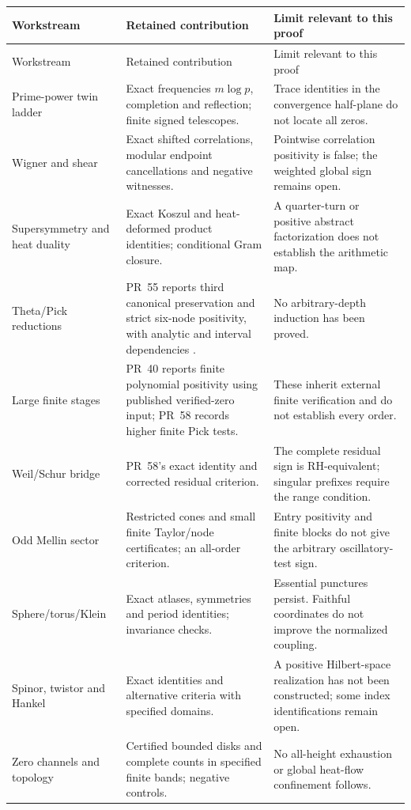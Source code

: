 \documentclass[11pt,letterpaper]{article}
\theoremstyle{definition}
\theoremstyle{remark}
\numberwithin{equation}{section}
\begin{document}
\begin{longtable}{>{\raggedright\arraybackslash}p{}>{\raggedright\arraybackslash}p{}>{\raggedright\arraybackslash}p{}}
\toprule
Workstream & Retained contribution & Limit relevant to this proof\\
\midrule\endfirsthead
\toprule Workstream & Retained contribution & Limit relevant to this proof\\\midrule\endhead
Prime-power twin ladder & Exact frequencies $m\log p$, completion and reflection; finite signed telescopes. & Trace identities in the convergence half-plane do not locate all zeros.\\
Wigner and shear & Exact shifted correlations, modular endpoint cancellations and negative witnesses. & Pointwise correlation positivity is false; the weighted global sign remains open.\\
Supersymmetry and heat duality & Exact Koszul and heat-deformed product identities; conditional Gram closure. & A quarter-turn or positive abstract factorization does not establish the arithmetic map.\\
Theta/Pick reductions & PR~55 reports third canonical preservation and strict six-node positivity, with analytic and interval dependencies \cite{pr55}. & No arbitrary-depth induction has been proved.\\
Large finite stages & PR~40 reports finite polynomial positivity using published verified-zero input; PR~58 records higher finite Pick tests. & These inherit external finite verification and do not establish every order.\\
Weil/Schur bridge & PR~58's exact identity and corrected residual criterion. & The complete residual sign is RH-equivalent; singular prefixes require the range condition.\\
Odd Mellin sector & Restricted cones and small finite Taylor/node certificates; an all-order criterion. & Entry positivity and finite blocks do not give the arbitrary oscillatory-test sign.\\
Sphere/torus/Klein & Exact atlases, symmetries and period identities; invariance checks. & Essential punctures persist. Faithful coordinates do not improve the normalized coupling.\\
Spinor, twistor and Hankel & Exact identities and alternative criteria with specified domains. & A positive Hilbert-space realization has not been constructed; some index identifications remain open.\\
Zero channels and topology & Certified bounded disks and complete counts in specified finite bands; negative controls. & No all-height exhaustion or global heat-flow confinement follows.\\

\end{longtable}
\end{document}
